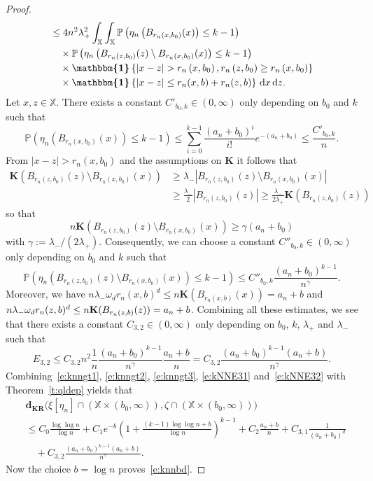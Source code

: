 \documentclass[10pt]{amsart}
\theoremstyle{definition}\newtheorem{defi}[theo]{Definition}\newtheorem{rema}[theo]{Remark}\newtheorem{exam}[theo]{Example}\newtheorem{exem}[theo]{Example}\newtheorem{nota}[theo]{Notation}
\newcommand*\bK{\mathbf{K}}
\newcommand*\dkr{\mathbf{d_{KR}}}
\renewcommand*\P{\mathbb{P}}
\newcommand*\X{\mathbb{X}}
\newcommand*\md{\mathrm{d}}
\newcommand{\ind}{\boldsymbol{\mathbbm{1}}}
\newcommand{\set}[1]{\left\{#1\right\}}
\newcommand{\param}[1]{\left(#1\right)}
\newcommand{\prob}[1]{\P\left(#1\right)}
\begin{document}
\begin{proof}
\begin{align*}
& \leq {4} n^2 \lambda_+^2 \int_{\X}\int_{\X} \prob{\eta_n \left(B_{r_n\left(x,b_0\right)}(x)\right) \leq k-1} \\
&\quad\times\prob{\eta_n\left(B_{r_n\left(z,b_0\right)}(z)\setminus B_{r_n\left(x,b_0\right)}(x)\right) \leq k-1} \\
&\quad\times \ind\set{|x-z|> r_n\left(x,b_0\right), r_n\left(z,b_0\right)\geq r_n\left(x,b_0\right)}\\
&\quad\times\ind\set{|x-z| \leq r_n(x,b) + r_n(z,b)} \, \md x \, \md z.
\end{align*}
Let $x,z\in\X$. There exists a constant $C'_{b_0,k}\in(0,\infty)$ only depending on $b_0$ and $k$ such that
\[
\prob{\eta_n \left(B_{r_n\left(x,b_0\right)}(x)\right) \leq k-1} \leq \sum_{i=0}^{k-1} \frac{\left(a_n+b_0\right)^i}{i!} e^{-\left(a_n+b_0\right)} \leq \frac{C'_{b_0,k}}{n}.
\]
From $|x-z|> r_n(x,b_0)$ and the assumptions on $\bK$ it follows that
\begin{align*}
\bK\left(B_{r_n\left(z,b_0\right)}(z)\setminus B_{r_n\left(x,b_0\right)}(x)\right) &\geq \lambda_{-} \left|B_{r_n\left(z,b_0\right)}(z)\setminus B_{r_n(x,b_0)}(x)\right| \\
&\geq \frac{\lambda_{-}}{2} \left|B_{r_n\left(z,b_0\right)}(z)\right| \geq \frac{\lambda_{-}}{2\lambda_{+}} \bK\left(B_{r_n\left(z,b_0\right)}(z)\right)
\end{align*}
so that
\[
n \bK\left(B_{r_n\left(z,b_0\right)}(z)\setminus B_{r_n\left(x,b_0\right)}(x)\right) \geq \gamma \left(a_n+b_0\right)
\]
with $\gamma:=\lambda_-/(2\lambda_+)$. Consequently, we can choose a constant $C''_{b_0,k}\in(0,\infty)$ only depending on $b_0$ and $k$ such that
\[
\prob{\eta_n\left(B_{r_n\left(z,b_0\right)}(z)\setminus B_{r_n\left(x,b_0\right)}(x)\right) \leq k-1} \leq C''_{b_0,k} \frac{\left(a_n+b_0\right)^{k-1}}{n^{\gamma}}.
\]
Moreover, we have $n \lambda_{-} \omega_d r_n(x,b)^d\leq n\bK(B_{r_n(x,b)}(x)) =a_n +b$ and $n \lambda_{-} \omega_d r_n(z,b)^d\linebreak\leq n\bK(B_{r_n(z,b)}(z)) =a_n +b$. Combining all these estimates, we see that there exists a constant $C_{3,2}\in(0,\infty)$ only depending on $b_0$, $k$, $\lambda_+$ and $\lambda_-$ such that
\begin{equation}\label{e:kNNE32}
E_{3,2} \leq C_{3,2} n^2 \frac{1}{n} \frac{\left(a_n+b_0\right)^{k-1}}{n^{\gamma}} \frac{a_n+b}{n} = C_{3,2} \frac{\left(a_n+b_0\right)^{k-1}\left(a_n+b\right)}{n^{\gamma}}.
\end{equation}
Combining~\eqref{e:knngt1}, \eqref{e:knngt2}, \eqref{e:knngt3}, \eqref{e:kNNE31} and~\eqref{e:kNNE32} with Theorem~\ref{t:qldep} yields that
\begin{align*}
& \dkr\big(\xi\left[\eta_n\right] \cap \left(\X \times \left(b_0,\infty\right)\right),\zeta \cap \left(\X \times \left(b_0,\infty\right)\right)\big) \\
& \leq C_0\frac{\log \log n}{\log n} + C_1 e^{-b}\param{1 + \frac{(k-1)\log \log n +b}{\log n}}^{k-1} + C_2 \frac{a_n + b}{n} + C_{3,1}\frac{1}{(a_n+b_0)^d} \\
& \quad + C_{3,2}\frac{(a_n+b_0)^{k-1}(a_n+b)}{n^{\gamma}}.
\end{align*}
Now the choice $b=\log n$ proves~\eqref{e:knnbd}.


\end{proof}
\end{document}
